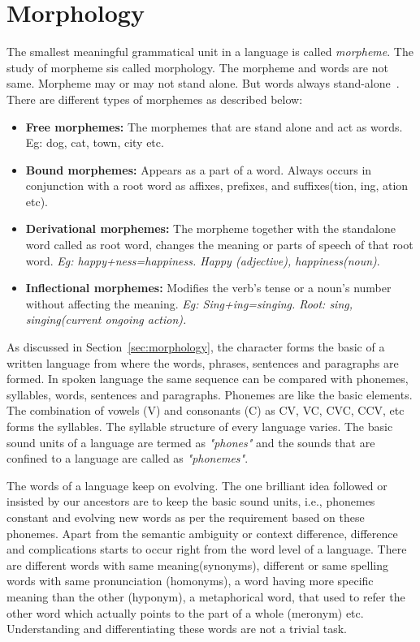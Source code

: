 \documentclass{bmcart}
\begin{document}
\section{Morphology}
\label{sec:morpho}
The smallest meaningful grammatical unit in a language is called \textit{morpheme}. The study of morpheme sis called morphology. 	The morpheme and words are not same. Morpheme may or may not stand alone. But words always stand-alone~\cite{morphology}.
There are different types of morphemes as described below:
\begin{itemize}
\item {\bf Free morphemes:} The morphemes that are stand alone and act as words. Eg: dog, cat, town, city etc.
\item {\bf Bound morphemes:} Appears as a part of a word. Always occurs in conjunction with a root word as affixes, prefixes, and suffixes(tion, ing, ation etc). 
\item {\bf Derivational morphemes:} The morpheme together with the standalone word called as root word, changes the meaning or parts of speech of that root word. \textit{Eg: happy+ness=happiness. Happy (adjective), happiness(noun)}.
\item {\bf Inflectional morphemes:} Modifies the verb's tense or a noun's number without affecting the meaning. 
\textit{Eg: Sing+ing=singing. Root: sing, singing(current ongoing action).}
\end{itemize}

As discussed in Section~\ref{sec:morphology}, the character forms the basic of a written language from where the words, phrases, sentences and paragraphs are formed. In spoken language the same sequence can be compared with phonemes, syllables, words, sentences and paragraphs. Phonemes are like the basic elements. The combination of vowels (V) and consonants (C) as CV, VC, CVC, CCV, etc forms the syllables. The syllable structure of every language varies. The basic sound units of a language are termed as \textit{"phones"} and the sounds that are confined to a language are called as \textit{"phonemes"}.

The words of a language keep on evolving. The one brilliant idea followed or insisted by our ancestors are to keep the basic sound units, i.e., phonemes constant and evolving new words as per the requirement based on these phonemes. Apart from the semantic ambiguity or context difference, difference and complications starts to occur right from the word level of a language. There are different words with same meaning(synonyms), different or same spelling words with same pronunciation (homonyms), a word having more specific meaning than the other (hyponym), a metaphorical word, that used to refer the other word which actually points to the part of a whole (meronym) etc. Understanding and differentiating these words are not a trivial task.
\end{document}
